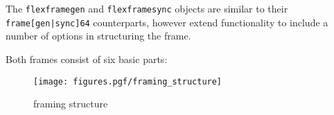 The {\tt flexframegen} and {\tt flexframesync} objects are similar to their
{\tt frame[gen|sync]64} counterparts, however extend functionality to include
a number of options in structuring the frame.

Both frames consist of six basic parts:


% 
%
\begin{figure}
\centering
  \texttt{[image: figures.pgf/framing\_structure]}
\caption{framing structure}
\label{fig:module:framing:structure}
\end{figure}


